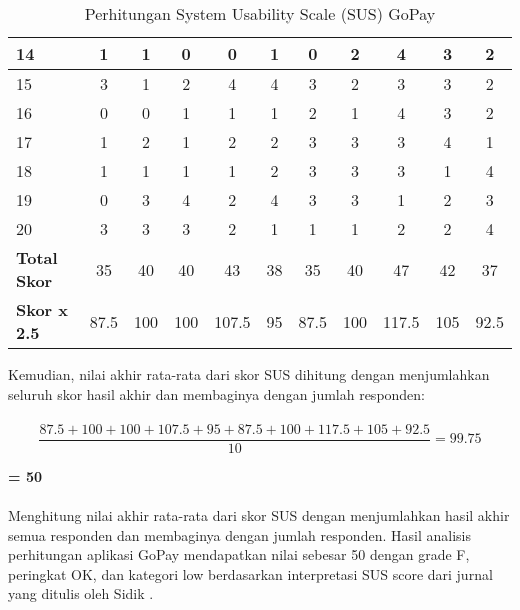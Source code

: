 \documentclass[
 manuscript=article,  %
  layout=publish, 
  year=2024, 
  month= Februari, %
  volume=8,
  number=1 
]{JIKO}
\begin{document}
\begin{table}[hbt!]
\begin{threeparttable}
\begin{tabular}{l*{10}{c}}
            \hline
            14 & 1 & 1 & 0 & 0 & 1 & 0 & 2 & 4 & 3 & 2 \\
            \hline
            15 & 3 & 1 & 2 & 4 & 4 & 3 & 2 & 3 & 3 & 2 \\
            \hline
            16 & 0 & 0 & 1 & 1 & 1 & 2 & 1 & 4 & 3 & 2 \\
            \hline
            17 & 1 & 2 & 1 & 2 & 2 & 3 & 3 & 3 & 4 & 1 \\
            \hline
            18 & 1 & 1 & 1 & 1 & 2 & 3 & 3 & 3 & 1 & 4 \\
            \hline
            19 & 0 & 3 & 4 & 2 & 4 & 3 & 3 & 1 & 2 & 3 \\
            \hline
            20 & 3 & 3 & 3 & 2 & 1 & 1 & 1 & 2 & 2 & 4 \\
            \midrule
            \textbf{Total Skor}   & 35 & 40 & 40 & 43 & 38 & 35 & 40 & 47 & 42 & 37 \\
            \hline
            \textbf{Skor x 2.5}   & 87.5 & 100 & 100 & 107.5 & 95 & 87.5 & 100 & 117.5 & 105 & 92.5 \\
            \bottomrule
        \end{tabular}
        \caption{Perhitungan System Usability Scale (SUS) GoPay}
        \label{tabel:sus_gopay}
    \end{threeparttable}
\end{table}

Kemudian, nilai akhir rata-rata dari skor SUS dihitung dengan menjumlahkan seluruh skor hasil akhir dan membaginya dengan jumlah responden: \\ \\ 
\[
\frac{87.5 + 100 + 100 + 107.5 + 95 + 87.5 + 100 + 117.5 + 105 + 92.5}{10} = 99.75
\]

\textbf{= 50} \\ \\ 
Menghitung nilai akhir rata-rata dari skor SUS dengan menjumlahkan hasil akhir semua responden dan membaginya dengan jumlah responden. Hasil analisis perhitungan aplikasi GoPay mendapatkan nilai sebesar 50 dengan grade F, peringkat OK, dan kategori low berdasarkan interpretasi SUS score dari jurnal yang ditulis oleh Sidik \cite{9}.
\end{document}
